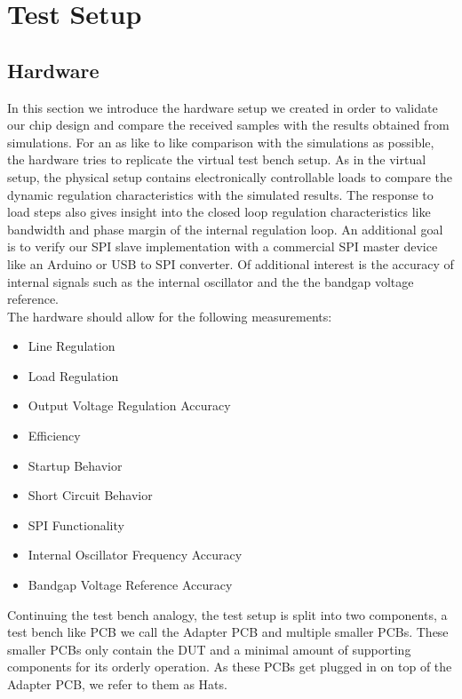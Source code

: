 \section{Test Setup}
\label{sec:testsetup}
\subsection{Hardware}
\label{sec:hardware}
In this section we introduce the hardware setup we created in order to validate our chip design and compare the received samples with the results obtained from simulations. For an as like to like comparison with the simulations as possible, the hardware tries to replicate the virtual test bench setup. As in the virtual setup, the physical setup contains electronically controllable loads to compare the dynamic regulation characteristics with the simulated results. The response to load steps also gives insight into the closed loop regulation characteristics like bandwidth and phase margin of the internal regulation loop. An additional goal is to verify our SPI slave implementation with a commercial SPI master device like an Arduino or USB to SPI converter. Of additional interest is the accuracy of internal signals such as the internal oscillator and the the bandgap voltage reference.\\
The hardware should allow for the following measurements:
\begin{itemize}
    \item Line Regulation
    \item Load Regulation
    \item Output Voltage Regulation Accuracy 
    \item Efficiency
    \item Startup Behavior
    \item Short Circuit Behavior
    \item SPI Functionality
    \item Internal Oscillator Frequency Accuracy
    \item Bandgap Voltage Reference Accuracy
\end{itemize}

Continuing the test bench analogy, the test setup is split into two components, a test bench like \ac{PCB} we call the Adapter \ac{PCB} and multiple smaller \ac{PCB}s. These smaller \ac{PCB}s only contain the \ac{DUT} and a minimal amount of supporting components for its orderly operation. As these \ac{PCB}s get plugged in on top of the Adapter \ac{PCB}, we refer to them as Hats.

